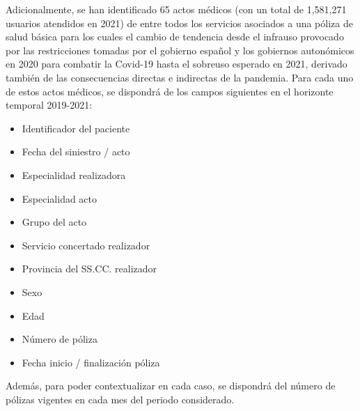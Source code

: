 \documentclass[12pt,twoside]{article} %
\begin{document}
Adicionalmente, se han identificado 65 actos médicos (con un total de 1,581,271 usuarios atendidos en 2021) de entre todos los servicios asociados a una póliza de salud básica para los cuales el cambio de tendencia desde el infrauso provocado por las restricciones tomadas por el gobierno español y los gobiernos autonómicos en 2020 para combatir la Covid-19 hasta el sobreuso esperado en 2021, derivado también de las consecuencias directas e indirectas de la pandemia. Para cada uno de estos actos médicos, se dispondrá de los campos siguientes en el horizonte temporal 2019-2021:
\begin{itemize}
 \item Identificador del paciente
 \item Fecha del siniestro / acto
 \item Especialidad realizadora
 \item Especialidad acto
 \item Grupo del acto
 \item Servicio concertado realizador
 \item Provincia del SS.CC. realizador
 \item Sexo
 \item Edad
 \item Número de póliza
 \item Fecha inicio / finalización póliza
\end{itemize}

Además, para poder contextualizar en cada caso, se dispondrá del número de pólizas vigentes en cada mes del periodo considerado.



%
%
\end{document}
